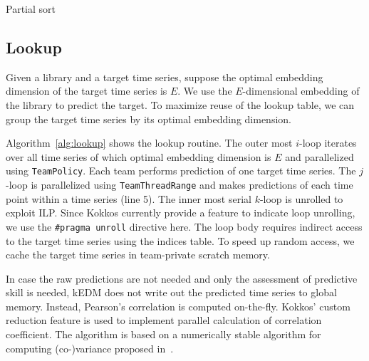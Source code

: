 \documentclass[sigconf]{acmart}
\begin{document}


\begin{algorithm}
    \SetAlgoLined
    \DontPrintSemicolon
    \caption{Partial sort}%
    \label{alg:partial-sort}
\end{algorithm}

\subsection{Lookup}

Given a library and a target time series, suppose the optimal embedding
dimension of the target time series is $E$. We use the $E$-dimensional embedding
of the library to predict the target. To maximize reuse of the lookup table, we
can group the target time series by its optimal embedding dimension.

Algorithm~\ref{alg:lookup} shows the lookup routine. The outer most $i$-loop
iterates over all time series of which optimal embedding dimension is $E$ and
parallelized using \texttt{TeamPolicy}. Each team performs prediction of one
target time series. The $j$-loop is parallelized using \texttt{TeamThreadRange}
and makes predictions of each time point within a time series (line 5). The
inner most serial $k$-loop is unrolled to exploit ILP\@. Since Kokkos currently
provide a feature to indicate loop unrolling, we use the \texttt{\#pragma
unroll} directive here. The loop body requires indirect access to the target
time series using the indices table. To speed up random access, we cache the
target time series in team-private scratch memory.

In case the raw predictions are not needed and only the assessment of
predictive skill is needed, kEDM does not write out the predicted time series
to global memory. Instead, Pearson’s correlation is computed on-the-fly.
Kokkos’ custom reduction feature is used to implement parallel calculation of
correlation coefficient. The algorithm is based on a numerically stable
algorithm for computing (co-)variance proposed in~\cite{Schubert2018}.
\end{document}
